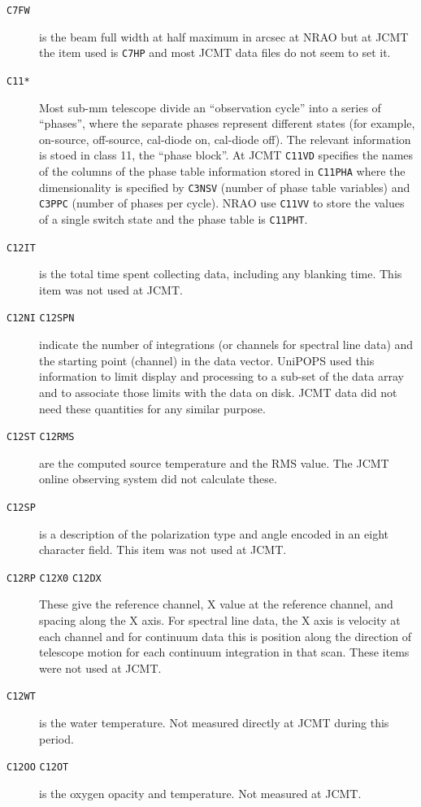 \documentclass[final,authoryear,5p,times,twocolumn]{elsarticle}
\begin{document}
\begin{description}
\item[\texttt{C7FW}] is the beam full width at half maximum in arcsec
  at NRAO but at JCMT the item used is \texttt{C7HP} and most JCMT data
  files do not seem to set it.

\item[\texttt{C11*}]
  Most sub-mm telescope divide an ``observation cycle'' into a series
  of ``phases'', where the separate phases represent different states
  (for example, on-source, off-source, cal-diode on, cal-diode
  off). The relevant information is stoed in class 11, the ``phase
  block''.  At JCMT \texttt{C11VD} specifies the names of the columns
  of the phase table information stored in \texttt{C11PHA} where the
  dimensionality is specified by \texttt{C3NSV} (number of phase table
  variables) and \texttt{C3PPC} (number of phases per cycle). NRAO use
  \texttt{C11VV} to store the values of a single switch state and the
  phase table is \texttt{C11PHT}.

\item[\texttt{C12IT}] is the total time spent collecting data,
  including any blanking time.  This item was not used at JCMT.

\item[\texttt{C12NI} \texttt{C12SPN}] indicate the number of integrations (or
  channels for spectral line data) and the starting point (channel) in the data vector.
  UniPOPS used this information to limit display and processing to a sub-set of the
  data array and to associate those limits with the data on disk.
  JCMT data did not need these quantities for any
  similar purpose.

\item[\texttt{C12ST} \texttt{C12RMS}] are the computed source
  temperature and the RMS value. The JCMT online observing system did
  not calculate these.

\item[\texttt{C12SP}] is a description of the polarization type and
  angle encoded in an eight character field. This item was not used at
  JCMT.

\item[\texttt{C12RP} \texttt{C12X0} \texttt{C12DX}] These give the
  reference channel, X value at the reference channel, and spacing along
  the X axis.  For spectral line data, the X axis is velocity at
  each channel and for continuum data this is position along the
  direction of telescope motion for each continuum integration in
  that scan.  These items were not used at JCMT.

\item[\texttt{C12WT}] is the water temperature. Not measured directly
  at JCMT during this period.

\item[\texttt{C12OO} \texttt{C12OT}] is the oxygen opacity and
  temperature. Not measured at JCMT.

\end{description}
\end{document}
